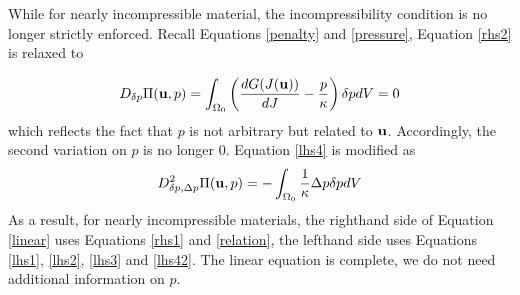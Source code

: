 While for nearly incompressible material, the incompressibility condition is no longer strictly enforced. Recall Equations \ref{penalty} and \ref{pressure}, Equation \ref{rhs2} is relaxed to

\begin{equation} \label{relation}
D_{\delta{p}}\Pi(\bold{u}, p) = \int_{\Omega_0}\left(  \frac{dG(J(\bold{u}))}{dJ} - \frac{p}{\kappa} \right)\delta{p}dV = 0
\end{equation}
which reflects the fact that $p$ is not arbitrary but related to $\bold{u}$.  
Accordingly, the second variation on $p$ is no longer $0$. Equation \ref{lhs4} is modified as
\begin{equation} \label{lhs42}
D_{\delta{p}, \Delta{p}}^2 \Pi(\bold{u}, p) = - \int_{\Omega_0}\frac{1}{\kappa}\Delta{p}\delta{p}dV
\end{equation}
As a result, for nearly incompressible materials, the righthand side of Equation \ref{linear} uses Equations \ref{rhs1} and \ref{relation}, the lefthand side uses Equations \ref{lhs1}, \ref{lhs2}, \ref{lhs3} and \ref{lhs42}. The linear equation is complete, we do not need additional information on $p$.





